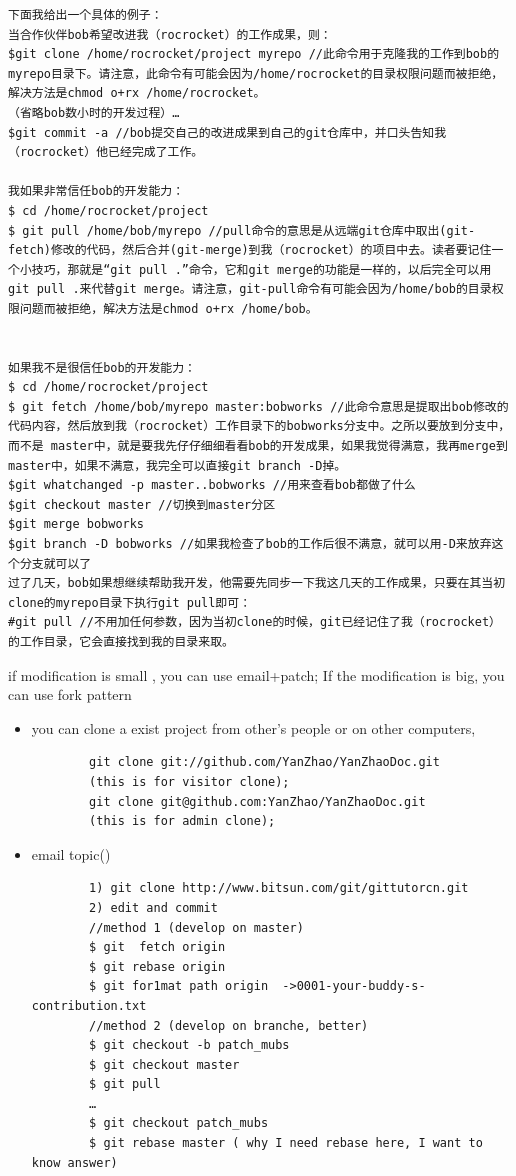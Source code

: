 \documentclass[a4paper,12pt,twoside]{book}
\begin{document}
\begin{CJK*}{UTF8}{song}
\begin{verbatim}
下面我给出一个具体的例子：
当合作伙伴bob希望改进我（rocrocket）的工作成果，则：
$git clone /home/rocrocket/project myrepo //此命令用于克隆我的工作到bob的myrepo目录下。请注意，此命令有可能会因为/home/rocrocket的目录权限问题而被拒绝，解决方法是chmod o+rx /home/rocrocket。
（省略bob数小时的开发过程）…
$git commit -a //bob提交自己的改进成果到自己的git仓库中，并口头告知我（rocrocket）他已经完成了工作。

我如果非常信任bob的开发能力：
$ cd /home/rocrocket/project
$ git pull /home/bob/myrepo //pull命令的意思是从远端git仓库中取出(git-fetch)修改的代码，然后合并(git-merge)到我（rocrocket）的项目中去。读者要记住一个小技巧，那就是“git pull .”命令，它和git merge的功能是一样的，以后完全可以用git pull .来代替git merge。请注意，git-pull命令有可能会因为/home/bob的目录权限问题而被拒绝，解决方法是chmod o+rx /home/bob。


如果我不是很信任bob的开发能力：
$ cd /home/rocrocket/project
$ git fetch /home/bob/myrepo master:bobworks //此命令意思是提取出bob修改的代码内容，然后放到我（rocrocket）工作目录下的bobworks分支中。之所以要放到分支中，而不是 master中，就是要我先仔仔细细看看bob的开发成果，如果我觉得满意，我再merge到master中，如果不满意，我完全可以直接git branch -D掉。
$git whatchanged -p master..bobworks //用来查看bob都做了什么
$git checkout master //切换到master分区
$git merge bobworks
$git branch -D bobworks //如果我检查了bob的工作后很不满意，就可以用-D来放弃这个分支就可以了
过了几天，bob如果想继续帮助我开发，他需要先同步一下我这几天的工作成果，只要在其当初clone的myrepo目录下执行git pull即可：
#git pull //不用加任何参数，因为当初clone的时候，git已经记住了我（rocrocket）的工作目录，它会直接找到我的目录来取。
\end{verbatim}

	if modification is small , you can use email+patch; If the modification is big, you can use fork pattern
	\begin{itemize}
    \item you can clone a exist project from other's people or on other computers,
		\begin{verbatim}
		git clone git://github.com/YanZhao/YanZhaoDoc.git
        (this is for visitor clone);
		git clone git@github.com:YanZhao/YanZhaoDoc.git
        (this is for admin clone);
		\end{verbatim}
	\item email topic()
		\begin{verbatim}
		1) git clone http://www.bitsun.com/git/gittutorcn.git
		2) edit and commit
		//method 1 (develop on master)
		$ git  fetch origin
		$ git rebase origin
		$ git for1mat path origin  ->0001-your-buddy-s-contribution.txt
		//method 2 (develop on branche, better)
		$ git checkout -b patch_mubs
		$ git checkout master
		$ git pull
		…
		$ git checkout patch_mubs
		$ git rebase master ( why I need rebase here, I want to know answer)
		

\end{verbatim}
\end{itemize}
\end{CJK*}
\end{document}
